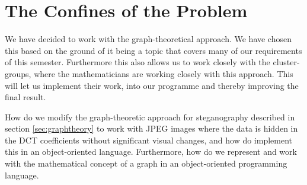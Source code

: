 \section{The Confines of the Problem}
We have decided to work with the graph-theoretical approach. 
We have chosen this based on the ground of it being a topic that covers many of our requirements of this semester. 
Furthermore this also allows us to work closely with the cluster-groups, where the mathematicians are working closely with this approach. 
This will let us implement their work, into our programme and thereby improving the final result.

\vspace{5mm}
\begin{centering}
	\begin{tcolorbox}[center title, title=Problem Statement, width=.7\textwidth]
		How do we modify the graph-theoretic approach for steganography described in section \ref{sec:graphtheory} to work with JPEG images where the data is hidden in the DCT coefficients without significant visual changes, and how do implement this in an object-oriented language. Furthermore, how do we represent and work with the mathematical concept of a graph in an object-oriented programming language.  
	\end{tcolorbox}
\end{centering}